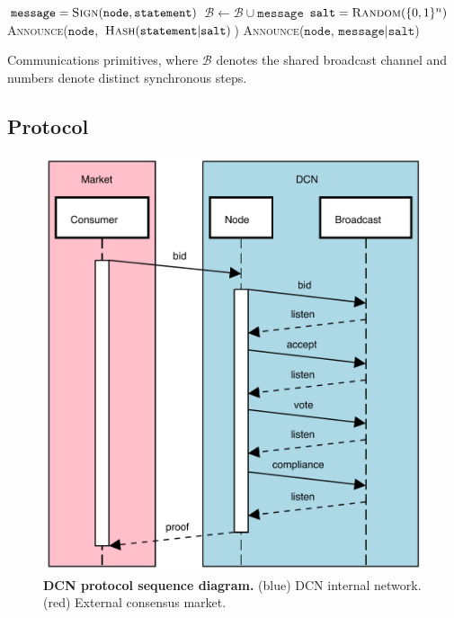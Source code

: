 
\begin{algorithm}[H]
	\begin{algorithmic}
		\State $\mathtt{message} = \textsc{Sign}(\mathtt{node}, \mathtt{statement})$
		\State $\mathcal{B} \gets \mathcal{B} \cup \mathtt{message}$ 
		\EndFunction
		\State
		\State $\mathtt{salt} = \textsc{Random}(\{0,1\}^n)$
		\State {}
		\State \textsc{Announce}($\mathtt{node}$, $\textsc{Hash}(\mathtt{statement}|\mathtt{salt})$)
		\State {}
		\State \textsc{Announce}($\mathtt{node}$, $\mathtt{message}|\mathtt{salt}$)
		\EndFunction
	\end{algorithmic}
	\caption{Communications primitives, where $\mathcal{B}$ denotes the shared broadcast channel and numbers denote distinct synchronous steps.} \label{alg:comms_primitive}
\end{algorithm}

\subsection{Protocol}

\begin{figure}[!htb]
	\includegraphics[width=\columnwidth]{figs/sequence_diagram.pdf}
	\caption{\textbf{DCN protocol sequence diagram.} (blue) DCN internal network. (red) External consensus market.} \label{fig:sequence_diagram}
\end{figure}

